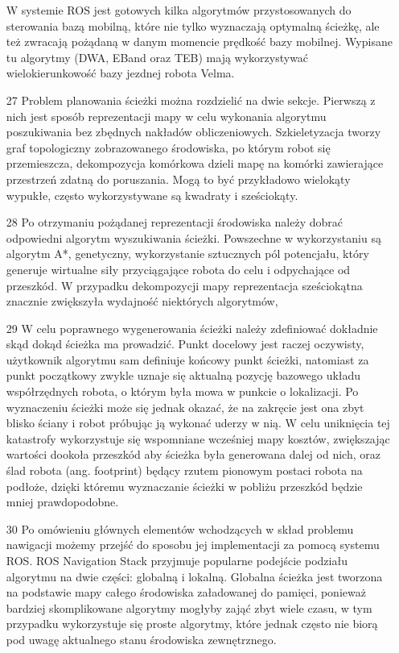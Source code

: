 \documentclass[20pt,a4paper]{article}
\begin{document}
\begin{itemize}
W systemie ROS jest gotowych kilka algorytmów przystosowanych do sterowania bazą mobilną, które nie tylko wyznaczają optymalną ścieżkę, ale też zwracają pożądaną w danym momencie prędkość bazy mobilnej.
Wypisane tu algorytmy (DWA, EBand oraz TEB) mają wykorzystywać wielokierunkowość bazy jezdnej robota Velma.
		\item[27]
		Problem planowania ścieżki można rozdzielić na dwie sekcje. 
Pierwszą z nich jest sposób reprezentacji mapy w celu wykonania algorytmu poszukiwania bez zbędnych nakładów obliczeniowych.
Szkieletyzacja tworzy graf topologiczny zobrazowanego środowiska, po którym robot się przemieszcza, dekompozycja komórkowa dzieli mapę na komórki zawierające przestrzeń zdatną do poruszania. Mogą to być przykładowo wielokąty wypukłe, często wykorzystywane są kwadraty i sześciokąty.
		\item[28]
		Po otrzymaniu pożądanej reprezentacji środowiska należy dobrać odpowiedni algorytm wyszukiwania ścieżki.
Powszechne w wykorzystaniu są algorytm A*, genetyczny, wykorzystanie sztucznych pól potencjału, który generuje wirtualne siły przyciągające robota do celu i odpychające od przeszkód.
W przypadku dekompozycji mapy reprezentacja sześciokątna znacznie zwiększyła wydajność niektórych algorytmów, 
		\item[29]
		 W celu poprawnego wygenerowania ścieżki należy zdefiniować dokładnie skąd dokąd ścieżka ma prowadzić.
Punkt docelowy jest raczej oczywisty, użytkownik algorytmu sam definiuje końcowy punkt ścieżki, natomiast za punkt początkowy zwykle uznaje się aktualną pozycję bazowego układu współrzędnych robota, o którym była mowa w punkcie o lokalizacji. 
Po wyznaczeniu ścieżki może się jednak okazać, że na zakręcie jest ona zbyt blisko ściany i robot próbując ją wykonać uderzy w nią.
W celu uniknięcia tej katastrofy wykorzystuje się wspomniane wcześniej mapy kosztów, zwiększając wartości dookoła przeszkód aby ścieżka była generowana dalej od nich, oraz ślad robota (ang. footprint) będący rzutem pionowym postaci robota na podłoże, dzięki któremu wyznaczanie ścieżki w pobliżu przeszkód będzie mniej prawdopodobne.
		\item[30]
		Po omówieniu głównych elementów wchodzących w skład problemu nawigacji możemy przejść do sposobu jej implementacji za pomocą systemu ROS.
ROS Navigation Stack przyjmuje popularne podejście podziału algorytmu na dwie części: globalną i lokalną.
Globalna ścieżka jest tworzona na podstawie mapy całego środowiska załadowanej do pamięci, ponieważ bardziej skomplikowane algorytmy mogłyby zająć zbyt wiele czasu, w tym przypadku wykorzystuje się proste algorytmy, które jednak często nie biorą pod uwagę aktualnego stanu środowiska zewnętrznego.

\end{itemize}
\end{document}

